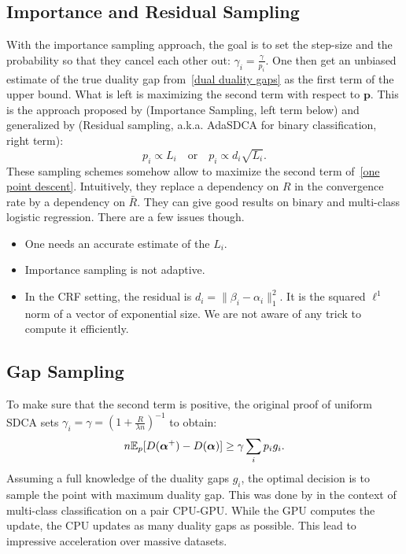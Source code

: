 \subsection{Importance and Residual Sampling}
With the importance sampling approach, the goal is to set the step-size and the probability so that they cancel each other out: $\gamma_i = \frac{\gamma}{p_i}$.
One then get an unbiased estimate of the true duality gap from~\eqref{dual duality gaps} as the first  term of the upper bound.
What is left is maximizing the second term with respect to $\bm p$.
This is the approach proposed by \citet{Zhao2015StochasticOptimizationImportance} (Importance Sampling, left term below) and generalized by \citet{csiba2015stochastic} (Residual sampling, a.k.a. AdaSDCA for binary classification, right term):
\begin{equation}
		p_i \propto L_i \quad \text{or} \quad p_i \propto d_i \sqrt{L_i}.
\end{equation}
These sampling schemes somehow allow to maximize the second term of~\eqref{one point descent}.
Intuitively, they replace a dependency on $R$ in the convergence rate by a dependency on $\bar R$.
They can give good results on binary and multi-class logistic regression. There are a few issues though.
\vspace{-\topsep}
\begin{itemize}
    \setlength{\parskip}{0pt}
    \setlength{\itemsep}{3pt plus 1pt}
    \item One needs an accurate estimate of the $L_i$.
    \item Importance sampling is not adaptive.
    \item In the CRF setting, the residual is $d_i = \| \beta_i -\alpha_i \|_1^2$.
    It is the squared $\ell^1$ norm of a vector of exponential size.
    We are not aware of any trick to compute it efficiently.
\end{itemize}
\vspace{-\topsep}

\subsection{Gap Sampling}\label{ssec:gap_sampling}
To make sure that the second term is positive, the original proof of uniform SDCA sets  $\gamma_i = \gamma = {(1+ \frac{R}{\lambda n})^{-1}}$ to obtain:
\begin{equation}
		n \mathbb E_p[D(\boldsymbol{\alpha}^+) - D(\boldsymbol{\alpha})]
		\geq \gamma \sum_i p_i g_i.
\end{equation}
Assuming a full knowledge of the duality gaps $g_i$, the optimal decision is to sample the point with maximum duality gap.
This was done by \citet{dunner2017efficient} in the context of multi-class classification on a pair CPU-GPU. While the GPU computes the update, the CPU updates as many duality gaps as possible.
This lead to impressive acceleration over massive datasets.

